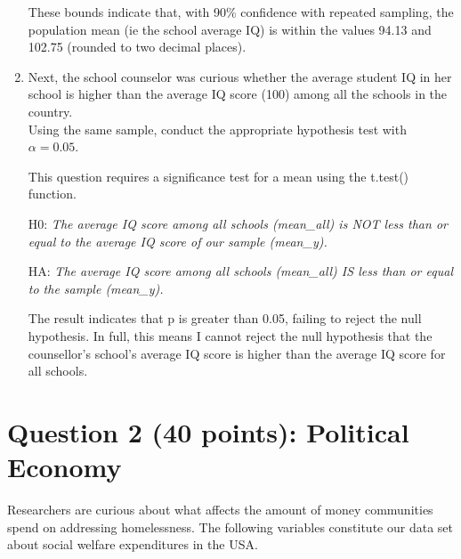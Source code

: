 \documentclass[12pt,letterpaper]{article}
\begin{document}
\begin{enumerate}
	
	
	\noindent These bounds indicate that, with 90\% confidence with repeated sampling, the population mean (ie the school average IQ) is within the values 94.13 and 102.75 (rounded to two decimal places). 
	
	\item Next, the school counselor was curious  whether  the average student IQ in her school is higher than the average IQ score (100) among all the schools in the country.\\ 
	
	\noindent Using the same sample, conduct the appropriate hypothesis test with $\alpha=0.05$.
	\vspace{.5cm}
	
	\noindent This question requires a significance test for a mean using the t.test() function.
	\vspace{.5cm}
	
	\indent H0: \textit{The average IQ score among all schools (mean\_all) is NOT less than or equal to the average IQ score of our sample (mean\_y).}
	
	HA: \textit{The average IQ score among all schools (mean\_all) IS less than or equal to the sample (mean\_y).}
	\vspace{.5cm}
	
	
	
	
	
	
	\noindent The result indicates that p is greater than 0.05, failing to reject the null hypothesis. In full, this means I cannot reject the null hypothesis that the counsellor's school's average IQ score is higher than the average IQ score for all schools.
	
\end{enumerate}

\newpage

	\section*{Question 2 (40 points): Political Economy}

\noindent Researchers are curious about what affects the amount of money communities spend on addressing homelessness. The following variables constitute our data set about social welfare expenditures in the USA. \\
\vspace{.5cm}
\end{document}
